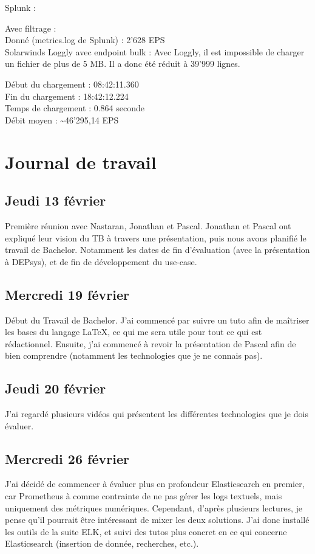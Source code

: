 \documentclass[paper=a4, fontsize=11pt]{scrartcl}
\begin{document}
Splunk :

Avec filtrage : \\
Donné (metrics.log de Splunk) : 2'628 EPS \\

Solarwinds Loggly avec endpoint bulk :
Avec Loggly, il est impossible de charger un fichier de plus de 5 MB. Il a donc été réduit à 39'999 lignes.

Début du chargement : 08:42:11.360 \\
Fin du chargement : 18:42:12.224 \\
Temps de chargement : 0.864 seconde \\
Débit moyen : \textasciitilde 46'295,14 EPS \\

\section{Journal de travail}


\subsection{Jeudi 13 février}
    Première réunion avec Nastaran, Jonathan et Pascal. Jonathan et Pascal ont expliqué leur vision du TB à travers une présentation, puis nous avons planifié le travail de Bachelor. Notamment les dates de fin d'évaluation (avec la présentation à DEPsys), et de fin de développement du use-case.
\subsection{Mercredi 19 février}
    Début du Travail de Bachelor. J'ai commencé par suivre un tuto afin de maîtriser les bases du langage \LaTeX, ce qui me sera utile pour tout ce qui est rédactionnel. Ensuite, j'ai commencé à revoir la présentation de Pascal afin de bien comprendre (notamment les technologies que je ne connais pas).
\subsection{Jeudi 20 février}
    J'ai regardé plusieurs vidéos qui présentent les différentes technologies que je dois évaluer.
\subsection{Mercredi 26 février}
    J'ai décidé de commencer à évaluer plus en profondeur Elasticsearch en premier, car Prometheus à comme contrainte de ne pas gérer les logs textuels, mais uniquement des métriques numériques. Cependant, d'après plusieurs lectures, je pense qu'il pourrait être intéressant de mixer les deux solutions. J'ai donc installé les outils de la suite ELK, et suivi des tutos plus concret en ce qui concerne Elasticsearch (insertion de donnée, recherches, etc.).
\end{document}
